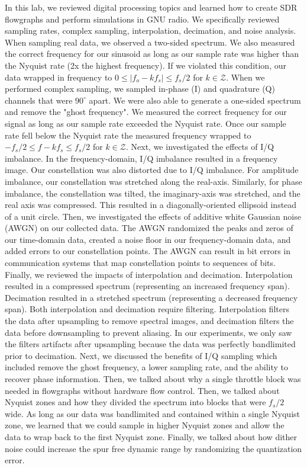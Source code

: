 \documentclass{article}
\begin{document}
In this lab, we reviewed digital processing topics and learned how to create SDR flowgraphs and perform simulations in GNU radio. We specifically reviewed sampling rates, complex sampling, interpolation, decimation, and noise analysis. When sampling real data, we observed a two-sided spectrum. We also measured the correct frequency for our sinusoid as long as our sample rate was higher than the Nyquist rate (2x the highest frequency). If we violated this condition, our data wrapped in frequency to $0 \leq |f_o - kf_s| \leq f_s/2$ for $k \in \mathcal{Z}$. When we performed complex sampling, we sampled in-phase (I) and quadrature (Q) channels that were $90^\circ$ apart. We were also able to generate a one-sided spectrum and remove the "ghost frequency". We measured the correct frequency for our signal as long as our sample rate exceeded the Nyquist rate. Once our sample rate fell below the Nyquist rate the measured frequency wrapped to $-f_s/2 \leq f - kf_s \leq f_s/2$ for $k \in \mathcal{Z}$. Next, we investigated the effects of I/Q imbalance. In the frequency-domain, I/Q imbalance resulted in a frequency image. Our constellation was also distorted due to I/Q imbalance. For amplitude imbalance, our constellation was stretched along the real-axis. Similarly, for phase imbalance, the constellation was tilted, the imaginary-axis was stretched, and the real axis was compressed. This resulted in a diagonally-oriented ellipsoid instead of a unit circle. Then, we investigated the effects of additive white Gaussian noise (AWGN) on our collected data. The AWGN randomized the peaks and zeros of our time-domain data, created a noise floor in our frequency-domain data, and added errors to our constellation points. The AWGN can result in bit errors in communication systems that map constellation points to sequences of bits. Finally, we reviewed the impacts of interpolation and decimation. Interpolation resulted in a compressed spectrum (representing an increased frequency span). Decimation resulted in a stretched spectrum (representing a decreased frequency span). Both interpolation and decimation require filtering. Interpolation filters the data after upsampling to remove spectral images, and decimation filters the data before downsampling to prevent aliasing. In our experiments, we only saw the filters artifacts after upsampling because the data was perfectly bandlimited prior to decimation. Next, we discussed the benefits of I/Q sampling which included remove the ghost frequency, a lower sampling rate, and the ability to recover phase information. Then, we talked about why a single throttle block was needed in flowgraphs without hardware flow control. Then, we talked about Nyquist zones and how they divided the spectrum into blocks that were $f_s/2$ wide. As long as our data was bandlimited and contained within a single Nyquist zone, we learned that we could sample in higher Nyquist zones and allow the data to wrap back to the first Nyquist zone. Finally, we talked about how dither noise could increase the spur free dynamic range by randomizing the quantization error.


\end{document}
